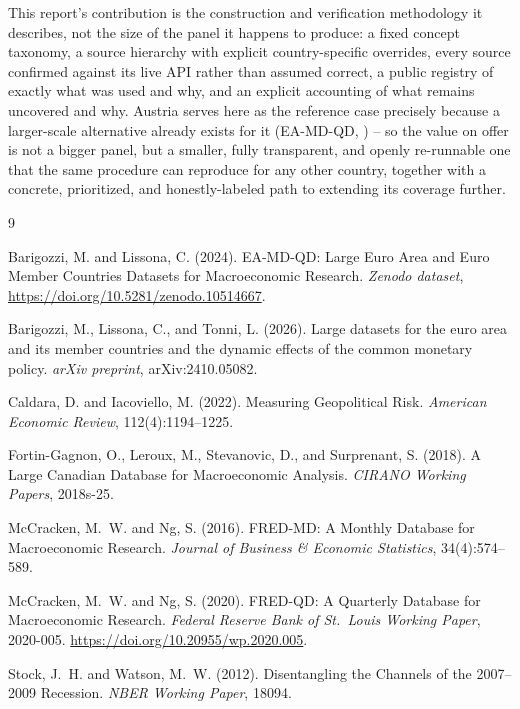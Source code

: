 \documentclass[11pt]{article}
\begin{document}
This report's contribution is the construction and verification
methodology it describes, not the size of the panel it happens to produce:
a fixed concept taxonomy, a source hierarchy with explicit
country-specific overrides, every source confirmed against its live API
rather than assumed correct, a public registry of exactly what was used
and why, and an explicit accounting of what remains uncovered and why.
Austria serves here as the reference case precisely because a
larger-scale alternative already exists for it (EA-MD-QD,
\citealp{barigozzi2024eamdqd}) -- so the value on offer is not a bigger
panel, but a smaller, fully transparent, and openly re-runnable one that
the same procedure can reproduce for any other country, together with a
concrete, prioritized, and honestly-labeled path to extending its
coverage further.


\begin{thebibliography}{9}

Barigozzi, M. and Lissona, C. (2024).
EA-MD-QD: Large Euro Area and Euro Member Countries Datasets for Macroeconomic Research.
\textit{Zenodo dataset}, \url{https://doi.org/10.5281/zenodo.10514667}.

Barigozzi, M., Lissona, C., and Tonni, L. (2026).
Large datasets for the euro area and its member countries and the dynamic effects of the common monetary policy.
\textit{arXiv preprint}, arXiv:2410.05082.

Caldara, D. and Iacoviello, M. (2022).
Measuring Geopolitical Risk.
\textit{American Economic Review}, 112(4):1194--1225.

Fortin-Gagnon, O., Leroux, M., Stevanovic, D., and Surprenant, S. (2018).
A Large Canadian Database for Macroeconomic Analysis.
\textit{CIRANO Working Papers}, 2018s-25.

McCracken, M.~W. and Ng, S. (2016).
FRED-MD: A Monthly Database for Macroeconomic Research.
\textit{Journal of Business \& Economic Statistics}, 34(4):574--589.

McCracken, M.~W. and Ng, S. (2020).
FRED-QD: A Quarterly Database for Macroeconomic Research.
\textit{Federal Reserve Bank of St.\ Louis Working Paper}, 2020-005.
\url{https://doi.org/10.20955/wp.2020.005}.

Stock, J.~H. and Watson, M.~W. (2012).
Disentangling the Channels of the 2007--2009 Recession.
\textit{NBER Working Paper}, 18094.

\end{thebibliography}
\end{document}
